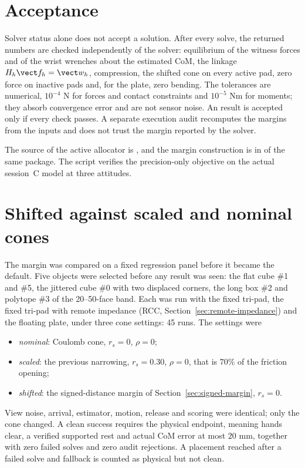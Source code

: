 \section{Acceptance}

Solver status alone does not accept a solution. After every solve, the returned numbers are checked independently of the solver: equilibrium of the witness forces and of the wrist wrenches about the estimated CoM, the linkage $H_h\vect f_h=\vect w_h$, compression, the shifted cone on every active pad, zero force on inactive pads and, for the plate, zero bending. The tolerances are numerical, $10^{-4}$ N for forces and contact constraints and $10^{-5}$ Nm for moments; they absorb convergence error and are not sensor noise. An  result is accepted only if every check passes. A separate execution audit recomputes the margins from the inputs and does not trust the margin reported by the solver.

The source of the active allocator is , and the margin construction is in  of the same package. The script  verifies the precision-only objective on the actual session~C model at three attitudes.

\section{Shifted against scaled and nominal cones}
\label{sec:margin-comparison}

The margin was compared on a fixed regression panel before it became the default. Five objects were selected before any result was seen: the flat cube \#1 and \#5, the jittered cube \#0 with two displaced corners, the long box \#2 and polytope \#3 of the 20--50-face band. Each was run with the fixed tri-pad, the fixed tri-pad with remote impedance (RCC, Section~\ref{sec:remote-impedance}) and the floating plate, under three cone settings: 45 runs. The settings were
\begin{itemize}
\item \emph{nominal}: Coulomb cone, $r_s=0$, $\rho=0$;
\item \emph{scaled}: the previous narrowing, $r_s=0.30$, $\rho=0$, that is $70\%$ of the friction opening;
\item \emph{shifted}: the signed-distance margin of Section~\ref{sec:signed-margin}, $r_s=0$.
\end{itemize}
View noise, arrival, estimator, motion, release and scoring were identical; only the cone changed. A clean success requires the physical endpoint, meaning hands clear, a verified supported rest and actual CoM error at most $20$ mm, together with zero failed solves and zero audit rejections. A placement reached after a failed solve and fallback is counted as physical but not clean.

